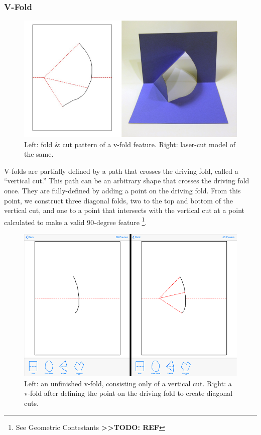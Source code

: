 \subsubsection{V-Fold}\label{v-fold}

\begin{figure}[htbp]
\centering
\includegraphics{figures/33_UI_Interface_Data_Structures/v.pdf}
\caption{Left: fold \& cut pattern of a v-fold feature. Right: laser-cut
model of the same.}
\end{figure}

V-folds are partially defined by a path that crosses the driving fold,
called a ``vertical cut.'' This path can be an arbitrary shape that
crosses the driving fold once. They are fully-defined by adding a point
on the driving fold. From this point, we construct three diagonal folds,
two to the top and bottom of the vertical cut, and one to a point that
intersects with the vertical cut at a point calculated to make a valid
90-degree feature \footnote{See Geometric Contestants
  \textbf{\textgreater{}\textgreater{}TODO: REF}}.

\begin{figure}[htbp]
\centering
\includegraphics{figures/33_UI_Interface_Data_Structures/vfold_before_after.png}
\caption{Left: an unfinished v-fold, consisting only of a vertical cut.
Right: a v-fold after defining the point on the driving fold to create
diagonal cuts.}
\end{figure}

